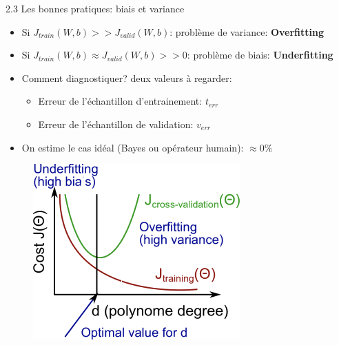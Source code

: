 \begin{frame}{2.3 Les bonnes pratiques: biais et variance}
  \begin{itemize}
  \item Si $J_{train}(W,b) >> J_{valid}(W,b)$: problème de variance: \textbf{Overfitting}
  \item Si $J_{train}(W,b) \approx J_{valid}(W,b) >> 0$: problème de biais: \textbf{Underfitting}
  \item Comment diagnostiquer? deux valeurs à regarder:
    \begin{itemize}
      \normalsize
    \item Erreur de l'échantillon d'entrainement: $t_{err}$
    \item Erreur de l'échantillon de validation: $v_{err}$
    \end{itemize}
  \item On estime le cas idéal (Bayes ou opérateur humain): $\approx 0\%$
  \end{itemize}
  \vspace{0.5cm}
  \begin{minipage}{.39\textwidth}
    \begin{figure}
      \includegraphics[trim={0 54 0 0},clip,width=\textwidth]{figs/biasVsVariance}
    \end{figure}
    \vspace{-0.5cm}
    \begin{center}
      \scriptsize
      \href{https://www.coursera.org/learn/machine-learning}{\color{blue}{[Coursera]}}

\end{center}
\end{minipage}
\end{frame}
